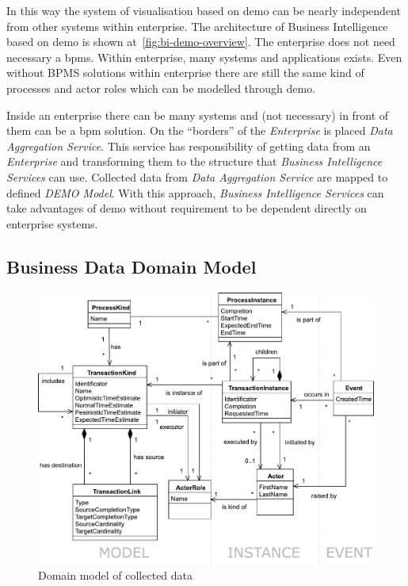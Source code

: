 In this way the system of visualisation based on \gls{demo} can be nearly independent from other systems within enterprise. The architecture of Business Intelligence based on \gls{demo} is shown at~\cref{fig:bi-demo-overview}. The enterprise does not need necessary a \gls{bpms}. Within enterprise, many systems and applications exists. Even without BPMS solutions within enterprise there are still the same kind of processes and actor roles which can be modelled through \gls{demo}.

Inside an enterprise there can be many systems and (not necessary) in front of them can be a \gls{bpm} solution. On the ``borders'' of the \textit{Enterprise} is placed \textit{Data Aggregation Service}. This service has responsibility of getting data from an \textit{Enterprise} and transforming them to the structure that \textit{Business Intelligence Services} can use. Collected data from \textit{Data Aggregation Service} are mapped to defined \textit{DEMO Model}.
With this approach, \textit{Business Intelligence Services} can take advantages of \gls{demo} without requirement to be dependent directly on enterprise systems.
\subsection{Business Data Domain Model}
\begin{figure}[ht!]
  \centering
  \includegraphics[width=13cm,keepaspectratio]{img/domain-data-model}
  \caption{Domain model of collected data}
  \label{fig:domain-data-model}
\end{figure}    

